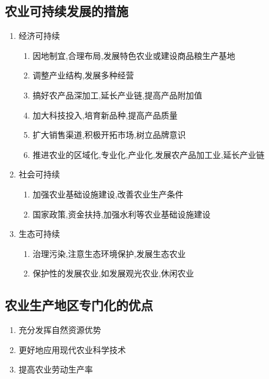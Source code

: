 \documentclass[a4paper]{article}
\begin{document}
    \subsection{农业可持续发展的措施}
    \begin{enumerate}
        \item 经济可持续
        \begin{enumerate}
            \item 因地制宜,合理布局,发展特色农业或建设商品粮生产基地
            \item 调整产业结构,发展多种经营
            \item 搞好农产品深加工,延长产业链,提高产品附加值
            \item 加大科技投入,培育新品种,提高产品质量
            \item 扩大销售渠道,积极开拓市场,树立品牌意识
            \item 推进农业的区域化,专业化,产业化,发展农产品加工业,延长产业链 %
        \end{enumerate}
        \item 社会可持续
        \begin{enumerate}
            \item 加强农业基础设施建设,改善农业生产条件
            \item 国家政策,资金扶持,加强水利等农业基础设施建设 %
        \end{enumerate}
        \item 生态可持续
        \begin{enumerate}
            \item 治理污染,注意生态环境保护,发展生态农业
            \item 保护性的发展农业,如发展观光农业,休闲农业
        \end{enumerate}
    \end{enumerate}
    \subsection{农业生产地区专门化的优点}
    \begin{enumerate}
        \item 充分发挥自然资源优势
        \item 更好地应用现代农业科学技术
        \item 提高农业劳动生产率
    \end{enumerate}
\end{document}
